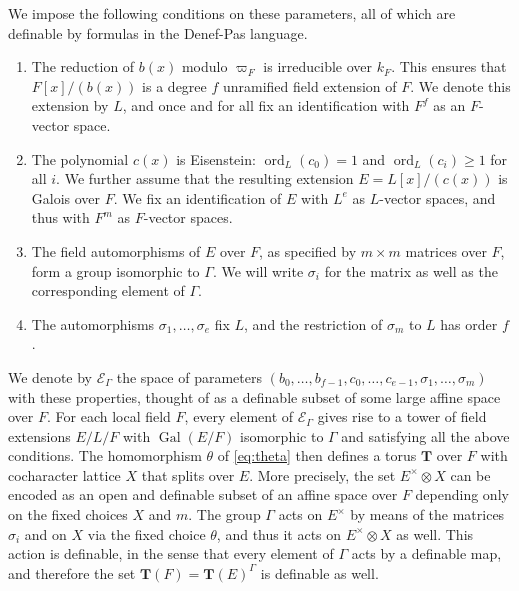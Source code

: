 \documentclass{amsart}
\DeclareMathOperator{\gal}{Gal}
\DeclareMathOperator{\ord}{ord}
\newcommand{\bT}{\mathbf {T}}
\newcommand\cE{{\mathcal E}}
\theoremstyle{plain}
\theoremstyle{definition}
\begin{document}
We impose the following conditions on these parameters, all of which are definable by formulas in the Denef-Pas language. 
\begin{enumerate}
\item The reduction of $b(x)$ modulo $\varpi_F$ is irreducible over $k_F$. 
This ensures that $F[x]/(b(x))$ is a degree $f$ unramified field extension of $F$. 
We denote this extension by $L$, and once and for all fix an identification with $F^f$ as 
an $F$-vector space. 
\item The polynomial $c(x)$ is Eisenstein: $\ord_L(c_0) = 1$ and $\ord_L(c_i) \ge 1$ for all $i$.
We further assume that the resulting extension $E = L[x]/(c(x))$ is Galois over $F$.
We fix an identification of $E$ with $L^e$ as $L$-vector spaces, and thus with $F^m$ as $F$-vector spaces. 
\item The field automorphisms of $E$ over $F$, as specified by $m \times m$ matrices over $F$, form a group isomorphic to $\Gamma$.
We will write $\sigma_i$ for the matrix as well as the corresponding element of $\Gamma$.
\item The automorphisms $\sigma_1, \dots, \sigma_e$ fix $L$, and the restriction of $\sigma_m$ to $L$ has order $f$.
\end{enumerate}
We denote by $\cE_\Gamma$ the space of parameters $(b_0, \dots, b_{f-1}, c_0, \dots, c_{e-1}, \sigma_1, \dots, \sigma_m)$ with these properties,
thought of as a definable subset of some large affine space over $F$.
For each local field $F$, every element of $\cE_\Gamma$ gives rise to a tower of field extensions $E/L/F$
with $\gal(E/F)$ isomorphic to $\Gamma$ and satisfying all the above conditions.
The homomorphism $\theta$ of \eqref{eq:theta} then defines a torus $\bT$ over $F$ with cocharacter lattice $X$ that splits over $E$.
More precisely, the set $E^\times \otimes X$ can be encoded as an open and definable subset
of an affine space over $F$ depending only on the fixed choices $X$ and $m$.
The group $\Gamma$ acts on $E^\times$ by means of the matrices $\sigma_i$ and on $X$
via the fixed choice $\theta$, and thus it acts on $E^\times \otimes X$ as well. 
This action is definable, in the sense that every element of $\Gamma$ acts by a definable map, and therefore the set
$\bT(F) = \bT(E)^\Gamma$ is definable as well.
\end{document}
